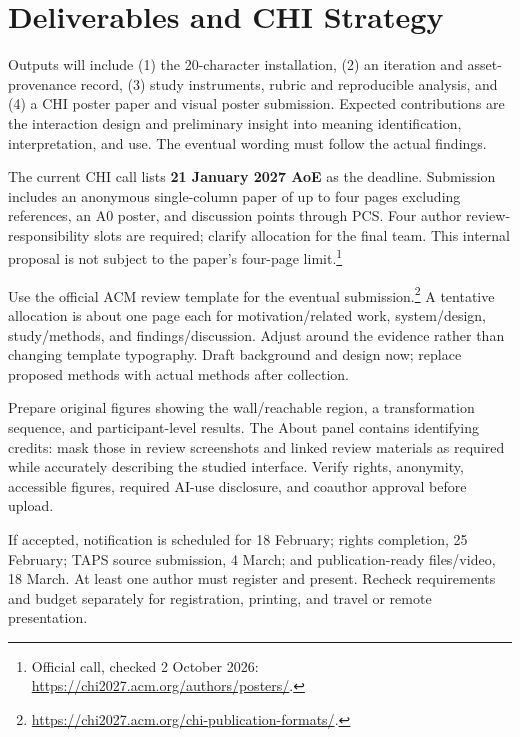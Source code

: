 \documentclass[11pt,letterpaper]{article}
\begin{document}
\section{Deliverables and CHI Strategy}
Outputs will include (1) the 20-character installation, (2) an iteration and asset-provenance record, (3) study instruments, rubric and reproducible analysis, and (4) a CHI poster paper and visual poster submission. Expected contributions are the interaction design and preliminary insight into meaning identification, interpretation, and use. The eventual wording must follow the actual findings.

The current CHI call lists \textbf{21 January 2027 AoE} as the deadline. Submission includes an anonymous single-column paper of up to four pages excluding references, an A0 poster, and discussion points through PCS. Four author review-responsibility slots are required; clarify allocation for the final team. This internal proposal is not subject to the paper's four-page limit.\footnote{Official call, checked 2 October 2026: \url{https://chi2027.acm.org/authors/posters/}.}

Use the official ACM review template for the eventual submission.\footnote{\url{https://chi2027.acm.org/chi-publication-formats/}.} A tentative allocation is about one page each for motivation/related work, system/design, study/methods, and findings/discussion. Adjust around the evidence rather than changing template typography. Draft background and design now; replace proposed methods with actual methods after collection.

Prepare original figures showing the wall/reachable region, a transformation sequence, and participant-level results. The About panel contains identifying credits: mask those in review screenshots and linked review materials as required while accurately describing the studied interface. Verify rights, anonymity, accessible figures, required AI-use disclosure, and coauthor approval before upload.

If accepted, notification is scheduled for 18 February; rights completion, 25 February; TAPS source submission, 4 March; and publication-ready files/video, 18 March. At least one author must register and present. Recheck requirements and budget separately for registration, printing, and travel or remote presentation.
\end{document}
